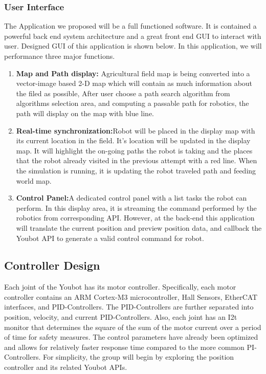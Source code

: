 \documentclass[titlepage]{article}
\begin{document}
\subsubsection{User Interface}
The Application we proposed will be a full functioned software. It is contained a powerful back end system architecture and a great front end GUI to interact with user.  Designed GUI of this application is shown below.
In this application, we will performance three major functions.
\begin{enumerate}
\item \textbf{Map and Path display:} Agricultural field map is being converted into a vector-image based 2-D map which will contain as much information about the filed as possible, After user choose a path search algorithm from algorithms selection area, and computing a passable path for robotics, the path will display on the map with blue line. 
\item \textbf{Real-time synchronization:}Robot will be placed in the display map with its current location in the field. It’s location will be updated in the display map. It will highlight the on-going paths the robot is taking and the places that the robot already visited in the previous attempt with a red line. When the simulation is running, it is updating the robot traveled path and feeding world map.
\item \textbf{Control Panel:}A dedicated control panel with a list tasks the robot can perform. In this display area, it is streaming the command performed by the robotics from corresponding API. However, at the back-end this application will translate the current position and preview position data, and callback the Youbot API to generate a valid control command for robot.
\end{enumerate}
\subsection{Controller Design}
Each joint of the Youbot has its motor controller. Specifically, each motor controller contains an ARM Cortex-M3 microcontroller, Hall Sensors, EtherCAT interfaces, and PID-Controllers. The PID-Controllers are further separated into position, velocity, and current PID-Controllers. Also, each joint has an I2t monitor that determines the square of the sum of the motor current over a period of time for safety measures. The control parameters have already been optimized and allows for relatively faster response time compared to the more common PI-Controllers. For simplicity, the group will begin by exploring the position controller and its related Youbot APIs.
\end{document}

